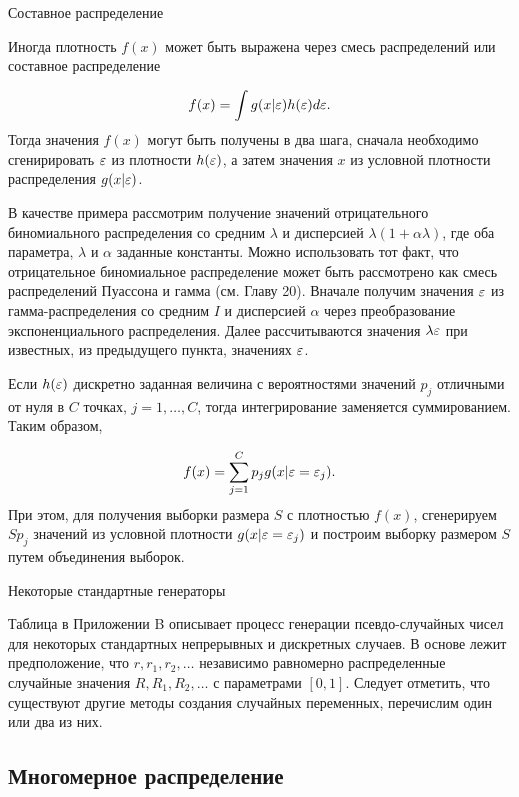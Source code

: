 \begin{center}
Составное распределение
\end{center}



Иногда плотность $f(x)$ может быть выражена через смесь распределений или составное распределение

\[
f(x)=\int{g(x|\varepsilon)h(\varepsilon)d\varepsilon}.
\]
Тогда значения $f(x)$ могут быть получены в два шага, сначала необходимо сгенирировать $\varepsilon$ из плотности $h(\varepsilon)$, а затем значения $x$ из условной плотности распределения $g(x|\varepsilon)$.

В качестве примера рассмотрим получение значений отрицательного биномиального распределения со средним $\lambda$ и дисперсией $\lambda(1+\alpha\lambda)$, где оба параметра, $\lambda$ и $\alpha$ заданные константы. Можно использовать тот факт, что отрицательное биномиальное распределение может быть рассмотрено как смесь распределений Пуассона и гамма (см. Главу 20). Вначале получим значения $\varepsilon$ из гамма-распределения со средним $I$ и дисперсией $\alpha$ через преобразование экспоненциального распределения. Далее рассчитываются значения $\lambda\varepsilon$ при известных, из предыдущего пункта, значениях $\varepsilon$.

Если $h(\varepsilon)$ дискретно заданная величина с вероятностями значений $p_j$ отличными от нуля в $C$ точках, $j=1,\ldots ,C$, тогда интегрирование заменяется суммированием. Таким образом,

\[
f(x)=\sum^{C}_{j=1}p_{j}g(x|\varepsilon=\varepsilon_{j}).
\]
При этом, для получения выборки размера $S$ с плотностью $f(x)$, сгенерируем $Sp_j$ значений из условной плотности $g(x|\varepsilon=\varepsilon_j)$ и построим выборку размером $S$ путем объединения выборок.

\begin{center}
Некоторые стандартные генераторы
\end{center}

Таблица в Приложении B описывает процесс генерации псевдо-случайных чисел для некоторых стандартных непрерывных и дискретных случаев. В основе лежит предположение, что $r,r_1,r_2,\ldots $ независимо равномерно распределенные случайные значения $R,R_1,R_2,\ldots $ с параметрами $[0,1]$. Следует отметить, что существуют другие методы создания случайных переменных, перечислим один или два из них.

\subsection{Многомерное распределение}

